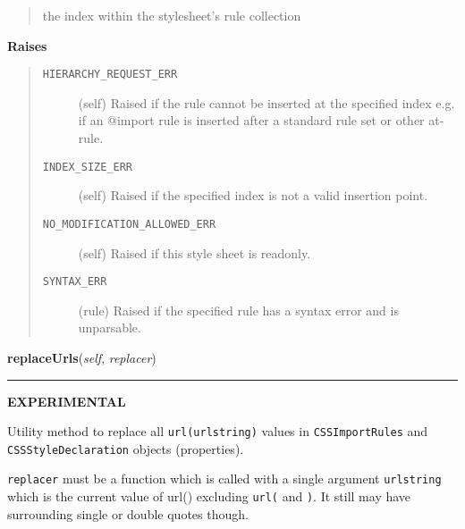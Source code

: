 \begin{boxedminipage}{\funcwidth}
\begin{quote}
the index within the stylesheet's rule collection
      \end{quote}

      \textbf{Raises}
    \vspace{-1ex}

      \begin{quote}
        \begin{description}

          \item[\texttt{HIERARCHY\_REQUEST\_ERR}]


(self)
Raised if the rule cannot be inserted at the specified index
e.g. if an @import rule is inserted after a standard rule set
or other at-rule.
          \item[\texttt{INDEX\_SIZE\_ERR}]


(self)
Raised if the specified index is not a valid insertion point.
          \item[\texttt{NO\_MODIFICATION\_ALLOWED\_ERR}]


(self)
Raised if this style sheet is readonly.
          \item[\texttt{SYNTAX\_ERR}]


(rule)
Raised if the specified rule has a syntax error and is
unparsable.
        \end{description}

      \end{quote}

    \end{boxedminipage}

    \label{cssutils:css:cssstylesheet:CSSStyleSheet:replaceUrls}

    \vspace{0.5ex}

\hspace{.8\funcindent}\begin{boxedminipage}{\funcwidth}

    \raggedright \textbf{replaceUrls}(\textit{self}, \textit{replacer})

    \vspace{-1.5ex}

    \rule{\textwidth}{0.5\fboxrule}
\setlength{\parskip}{2ex}

\textbf{EXPERIMENTAL}

Utility method to replace all \texttt{url(urlstring)} values in
\texttt{CSSImportRules} and \texttt{CSSStyleDeclaration} objects (properties).

\texttt{replacer} must be a function which is called with a single
argument \texttt{urlstring} which is the current value of url()
excluding \texttt{url(} and \texttt{)}. It still may have surrounding
single or double quotes though.
\setlength{\parskip}{1ex}
    \end{boxedminipage}

